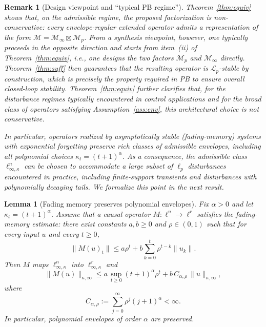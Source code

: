 \documentclass[journal,twoside,web]{ieeecolor}
\newtheorem{lemma}{Lemma}
\newtheorem{remark}{Remark}
\newcommand{\operator}{\mathcal{M}}
\begin{document}
\begin{remark}[Design viewpoint and ``typical PB regime'']\label{rem:typical-pb}
Theorem~\ref{thm:equiv} shows that, on the admissible regime, the proposed factorization is
non-conservative: every envelope-regular extended operator admits a representation of the form
\(\operator=\operator_\infty\boxtimes \operator_p\).
From a synthesis viewpoint, however, one typically proceeds in the opposite direction and starts from
item~\textup{(ii)} of Theorem~\ref{thm:equiv}, i.e., one designs the two factors
\(\operator_p\) and \(\operator_\infty\) directly.
Theorem~\ref{thm:suff} then guarantees that the resulting operator is \(\mathcal L_p\)-stable by
construction, which is precisely the property required in PB to ensure overall closed-loop stability.
Theorem~\ref{thm:equiv} further clarifies that, for the disturbance regimes typically encountered in
control applications and for the broad class of operators satisfying Assumption~\ref{ass:env}, this
architectural choice is not conservative.

In particular, operators realized by asymptotically stable (fading-memory) systems with exponential
forgetting preserve rich classes of admissible envelopes, including all polynomial choices
\(\kappa_t=(t+1)^\alpha\).
As a consequence, the admissible class \(\ell_{\infty,\kappa}^n\) can be chosen to accommodate a large
subset of \(\ell_p\) disturbances encountered in practice, including finite-support transients and
disturbances with polynomially decaying tails. We formalize this point in the next result.
\end{remark}

\begin{lemma}[Fading memory preserves polynomial envelopes]
\label{lem:fading-poly}
Fix \(\alpha>0\) and let \(\kappa_t=(t+1)^\alpha\).
Assume that a causal operator \(M:\ell^n\to\ell^r\) satisfies the fading-memory estimate:
there exist constants \(a,b\ge 0\) and \(\rho\in(0,1)\) such that for every input \(u\) and every \(t\ge 0\),
\begin{equation}\label{eq:fading}
\|M(u)_t\|
\le
a\rho^t + b\sum_{k=0}^{t}\rho^{t-k}\|u_k\|.
\end{equation}
Then \(M\) maps \(\ell_{\infty,\kappa}^n\) into \(\ell_{\infty,\kappa}^r\) and
\begin{equation}\label{eq:fading-poly-bound}
\|M(u)\|_{\kappa,\infty}
\le
a\,\sup_{t\ge 0}(t+1)^\alpha\rho^t
+
b\,C_{\alpha,\rho}\,\|u\|_{\kappa,\infty},
\end{equation}
where
\[
C_{\alpha,\rho}
:=
\sum_{j=0}^\infty \rho^{j}(j+1)^\alpha
<\infty.
\]
In particular, polynomial envelopes of order \(\alpha\) are preserved.
\end{lemma}
\end{document}
